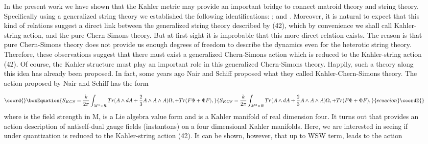 \documentclass[a4paper,12pt]{article}
\begin{document}
In the present work we have shown that the Kahler metric may provide an
important bridge to connect matroid theory and string theory. Specifically
using a generalized string theory we established the following
identifications: \coordHE{} ; \coordHE{} and \coordHE{}. Moreover, it is natural
to expect that this kind of relations suggest a direct link between the
generalized string theory described by (42), which by convenience we shall
call Kahler-string action, and the pure Chern-Simons theory. But at first
sight it is improbable that this more direct relation exists. The reason is
that pure Chern-Simons theory does not provide us enough degrees of freedom
to describe the dynamics even for the heterotic string theory. Therefore,
these observations suggest that there must exist a generalized Chern-Simons
action which is reduced to the Kahler-string action (42). Of course, the
Kahler structure must play an important role in this generalized
Chern-Simons theory. Happily, such a theory along this idea has already been
proposed. In fact, some years ago Nair and Schiff\coordHE{} proposed what they
called Kahler-Chern-Simons theory. The action proposed by Nair and Schiff
has the form

\begin{equation}\coord{}\boxEquation{
S_{KCS}=\frac{k}{2\pi }\int_{M^{3}\times R}Tr(A\wedge dA+\frac{2}{3}A\wedge
A\wedge A)\Omega ,+Tr(F\Phi +\Phi F),  \label{46}
}{
S_{KCS}=\frac{k}{2\pi }\int_{M^{3}\times R}Tr(A\wedge dA+\frac{2}{3}A\wedge
A\wedge A)\Omega ,+Tr(F\Phi +\Phi F),  }{ecuacion}\coordE{}\end{equation}
where \coordHE{} is the field strength in M\coordHE{}, \myHighlight{$\Phi $}\coordHE{} is a Lie algebra
value \coordHE{} form and \coordHE{}is a Kahler manifold of real dimension four.
It turns out that \coordHE{} provides an action description of antiself-dual
gauge fields (instantons) on a four dimensional Kahler manifolds. Here, we
are interested in seeing if under quantization \coordHE{} is reduced to the
Kahler-string action (42). It can be shown, however, that up to WSW term, \coordHE{} leads to the action
\end{document}
